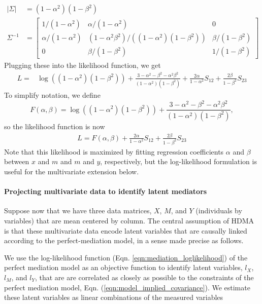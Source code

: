 \documentclass[
]{article}
\begin{document}
\begin{align}
    \left|\Sigma\right| &= (1-\alpha^2)(1-\beta^2) \\
    \Sigma^{-1} &= 
    \begin{bmatrix}
    1/(1-\alpha^2) & \alpha/(1-\alpha^2) & 0 \\
    \alpha/(1-\alpha^2) & (1-\alpha^2\beta^2)/\left((1-\alpha^2)(1-\beta^2)\right) & \beta/(1-\beta^2) \\
    0 & \beta/(1-\beta^2) & 1/(1-\beta^2)
    \end{bmatrix}
\end{align} Plugging these into the likelihood function, we get
\begin{align}
\label{eqn:mediation_loglikelihood}
L = &\log\left((1-\alpha^2)(1-\beta^2)\right) + \frac{3 - \alpha^2 - \beta^2 - \alpha^2\beta^2}{(1-\alpha^2)(1-\beta^2)} + \frac{2\alpha}{1-\alpha^2} S_{12} + \frac{2\beta}{1-\beta^2} S_{23}
\end{align} To simplify notation, we define \begin{equation}
F(\alpha,\beta) = \log\left((1-\alpha^2)(1-\beta^2)\right) + \frac{3 - \alpha^2 - \beta^2 - \alpha^2\beta^2}{(1-\alpha^2)(1-\beta^2)},
\end{equation} so the likelihood function is now \begin{align}
\label{eqn:mediation_loglikelihood_simple}
L = F(\alpha, \beta) + \frac{2\alpha}{1-\alpha^2} S_{12} + \frac{2\beta}{1-\beta^2} S_{23}
\end{align} Note that this likelihood is maximized by fitting regression
coefficients \(\alpha\) and \(\beta\) between \(x\) and \(m\) and \(m\)
and \(y\), respectively, but the log-likelihood formulation is useful
for the multivariate extension below.

\paragraph{Projecting multivariate data to identify latent
mediators}\label{projecting-multivariate-data-to-identify-latent-mediators}

Suppose now that we have three data matrices, \(X\), \(M\), and \(Y\)
(individuals by variables) that are mean centered by column. The central
assumption of HDMA is that these multivariate data encode latent
variables that are causally linked according to the perfect-mediation
model, in a sense made precise as follows.

We use the log-likelihood function (Eqn.
\ref{eqn:mediation_loglikelihood}) of the perfect mediation model as an
objective function to identify latent variables, \(l_X\), \(l_M\), and
\(l_Y\), that are are correlated as closely as possible to the
constraints of the perfect mediation model, Eqn.
(\ref{eqn:model_implied_covariance}). We estimate these latent variables
as linear combinations of the measured variables
\end{document}
